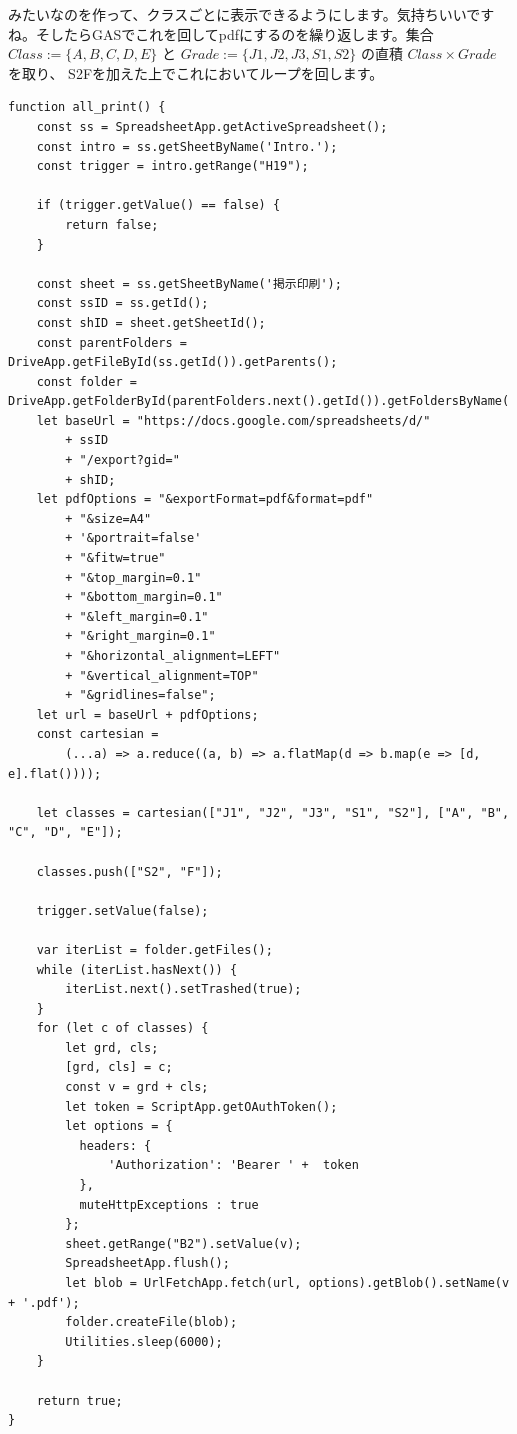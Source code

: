 \documentclass[a4paper]{ltjsreport}
\begin{document}
みたいなのを作って、クラスごとに表示できるようにします。気持ちいいですね。そしたらGASでこれを回してpdfにするのを繰り返します。集合 $Class:=\{A,B,C,D,E\}$ と $Grade:=\{J1,J2,J3,S1,S2\}$ の直積 $Class\times Grade$ を取り、 S2Fを加えた上でこれにおいてループを回します。

\begin{lstlisting}
function all_print() {
    const ss = SpreadsheetApp.getActiveSpreadsheet();
    const intro = ss.getSheetByName('Intro.');
    const trigger = intro.getRange("H19");

    if (trigger.getValue() == false) {
        return false;
    }

    const sheet = ss.getSheetByName('掲示印刷');
    const ssID = ss.getId();
    const shID = sheet.getSheetId();
    const parentFolders = DriveApp.getFileById(ss.getId()).getParents();
    const folder = DriveApp.getFolderById(parentFolders.next().getId()).getFoldersByName('pdf').next();
    let baseUrl = "https://docs.google.com/spreadsheets/d/"
        + ssID
        + "/export?gid="
        + shID;
    let pdfOptions = "&exportFormat=pdf&format=pdf"
        + "&size=A4"
        + '&portrait=false'
        + "&fitw=true"
        + "&top_margin=0.1"
        + "&bottom_margin=0.1"
        + "&left_margin=0.1"
        + "&right_margin=0.1"
        + "&horizontal_alignment=LEFT"
        + "&vertical_alignment=TOP"
        + "&gridlines=false";
    let url = baseUrl + pdfOptions;
    const cartesian =
        (...a) => a.reduce((a, b) => a.flatMap(d => b.map(e => [d, e].flat())));

    let classes = cartesian(["J1", "J2", "J3", "S1", "S2"], ["A", "B", "C", "D", "E"]);

    classes.push(["S2", "F"]);

    trigger.setValue(false);

    var iterList = folder.getFiles();
    while (iterList.hasNext()) {
        iterList.next().setTrashed(true);
    }
    for (let c of classes) {
        let grd, cls;
        [grd, cls] = c;
        const v = grd + cls;
        let token = ScriptApp.getOAuthToken();
        let options = {
          headers: {
              'Authorization': 'Bearer ' +  token
          },
          muteHttpExceptions : true
        };
        sheet.getRange("B2").setValue(v);
        SpreadsheetApp.flush();
        let blob = UrlFetchApp.fetch(url, options).getBlob().setName(v + '.pdf');
        folder.createFile(blob);
        Utilities.sleep(6000);
    }

    return true;
}
\end{lstlisting}
\end{document}
